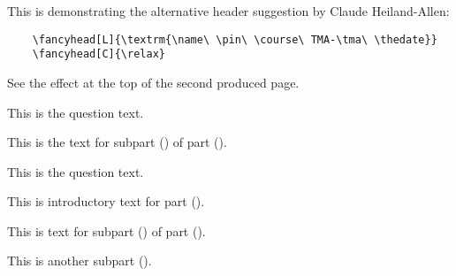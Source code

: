 \documentclass[a4paper,12pt]{article}
\begin{document}
	\maketitle

    This is demonstrating the alternative header suggestion by Claude Heiland-Allen:
    \begin{verbatim}
    \fancyhead[L]{\textrm{\name\ \pin\ \course\ TMA-\tma\ \thedate}}
    \fancyhead[C]{\relax}
    \end{verbatim}
    See the effect at the top of the second produced page.

	\begin{question}
		This is the question text. \lipsum[1][1-2]
		
		\qpart \qsubpart
		This is the text for subpart (\theqsubpart) of part (\theqpart). \lipsum[1][3-6]
		
	\end{question}
	
	\begin{question}
		This is the question text. \lipsum[1][7-8]
		
		\qpart
		This is introductory text for part (\theqpart). \lipsum[1][9]
		
		\qsubpart
		This is text for subpart (\theqsubpart) of part (\theqpart). \lipsum[1][10-12]
		
		\qsubpart
		This is another subpart (\theqsubpart).
		
	\end{question}
	
	\begin{question}
		\qpart %
		\qsubpart %
		\lipsum[1][2]
		
		\qsubpart %
		\lipsum[1][3-6]
	\end{question}
	\begin{question}
		\lipsum[2][1-4]
		
		\qpart %
		\lipsum[2][5-6]
		
		\qpart %
		\qsubpart %
		\lipsum[2][7]
		
		\qsubpart %
		\lipsum[2][8-9]
		
		\qsubpart %
		\lipsum[2][10]
				
		\qsubpart %
		\lipsum[2][11]
		
		\qpart %
		\lipsum[3]
		
	\end{question}
	
\end{document}
